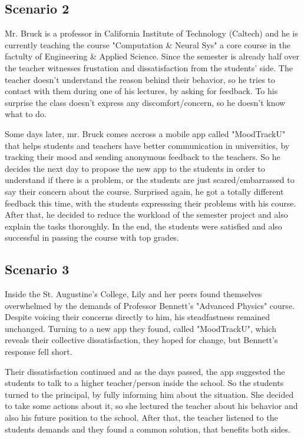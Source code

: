 \documentclass[11pt]{report}
\begin{document}
\subsection{Scenario 2}

Mr. Bruck is a professor in California Institute of Technology (Caltech) and he is currently teaching the course "Computation \& Neural Sys" a core course in the factulty of Engineering \& Applied Science. Since the semester is already half over the teacher witnesses frustation and dissatisfaction from the students' side. The teacher doesn't understand the reason behind their behavior, so he tries to contact with them during one of his lectures, by asking for feedback. To his surprise the class doesn't express any discomfort/concern, so he doesn't know what to do.
\newline

\noindent Some days later, mr. Bruck comes accross a mobile app called "MoodTrackU" that helps students and teachers have better communication in universities, by tracking their mood and sending anonymous feedback to the teachers. So he decides the next day to propose the new app to the students in order to understand if there is a problem, or the students are just scared/embarrassed to say their concern about the course. Surprised again, he got a totally different feedback this time, with the students expresssing their problems with his course. After that, he decided to reduce the workload of the semester project and also explain the tasks thoroughly. In the end, the students were satisfied and also successful in passing the course with top grades.

\subsection{Scenario 3}

Inside the St. Augustine’s College, Lily and her peers found themselves overwhelmed by the demands of Professor Bennett's "Advanced Physics" course. Despite voicing their concerns directly to him, his steadfastness remained unchanged. Turning to a new app they found, called "MoodTrackU", which reveals their collective dissatisfaction, they hoped for change, but Bennett's response fell short.
\newline

\noindent Their dissatisfaction continued and as the days passed, the app suggested the students to talk to a higher teacher/person inside the school. So the students turned to the principal, by fully informing him about the situation. She decided to take some actions about it, so she lectured the teacher about his behavior and also his future position to the school. After that, the teacher listened to the students demands and they found a common solution, that benefits both sides. 
\end{document}
